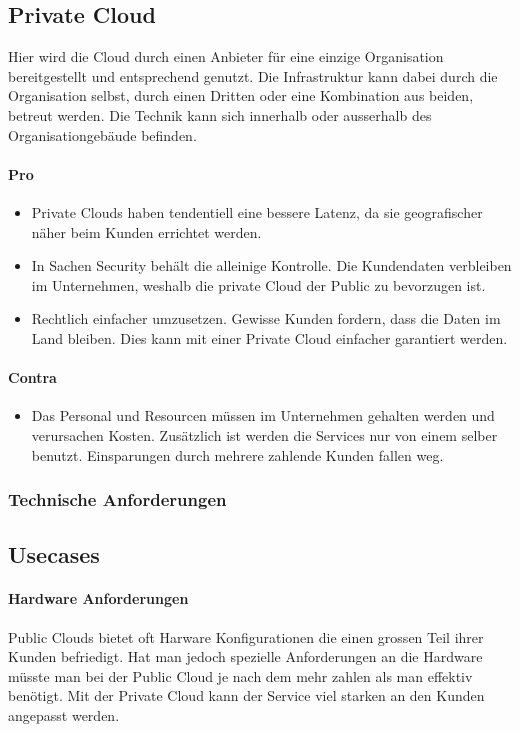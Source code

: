 \subsection{Private Cloud}
Hier wird die Cloud durch einen Anbieter für eine einzige Organisation bereitgestellt und entsprechend genutzt. Die Infrastruktur kann dabei durch die Organisation selbst, durch einen Dritten oder eine Kombination aus beiden, betreut werden. Die Technik kann sich innerhalb oder ausserhalb des Organisationgebäude befinden.
\paragraph{Pro}
\begin{itemize}
	\item Private Clouds haben tendentiell eine bessere Latenz, da sie geografischer näher beim Kunden errichtet werden. 
	\item In Sachen Security behält die alleinige Kontrolle. Die Kundendaten verbleiben im Unternehmen, weshalb die private Cloud der Public zu bevorzugen ist.
	\item Rechtlich einfacher umzusetzen. Gewisse Kunden fordern, dass die Daten im Land bleiben. Dies kann mit einer Private Cloud einfacher garantiert werden.
\end{itemize}

\paragraph{Contra}
\begin{itemize}
	\item Das Personal und Resourcen müssen im Unternehmen gehalten werden und verursachen Kosten. Zusätzlich ist werden die Services nur von einem selber benutzt. Einsparungen durch mehrere zahlende Kunden fallen weg.
\end{itemize}


\subsubsection{Technische Anforderungen}



\subsection{Usecases}
\paragraph{Hardware Anforderungen} Public Clouds bietet oft Harware Konfigurationen die einen grossen Teil ihrer Kunden befriedigt. Hat man jedoch spezielle Anforderungen an die Hardware müsste man bei der Public Cloud je nach dem mehr zahlen als man effektiv benötigt. Mit der Private Cloud kann der Service viel starken an den Kunden angepasst werden.



